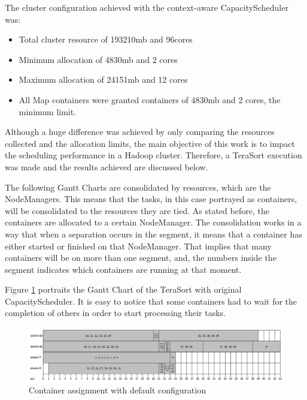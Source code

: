 The cluster configuration achieved with the context-aware CapacityScheduler was: 
\begin{itemize}
	\item Total cluster resource of 193210mb and 96cores
	\item Minimum allocation of 4830mb and 2 cores
	\item Maximum allocation of 24151mb and 12 cores
	\item All Map containers were granted containers of 4830mb and 2 cores, the minimum limit.
\end{itemize}

Although a huge difference was achieved by only comparing the resources collected and the allocation limits, the main objective of this work is to impact the scheduling performance in a Hadoop cluster. Therefore, a TeraSort execution was made and the results achieved are discussed below.

The following Gantt Charts are consolidated by resources, which are the NodeManagers. This means that the tasks, in this case portrayed as containers, will be consolidated to the resources they are tied. As stated before, the containers are allocated to a certain NodeManager. The consolidation works in a way that when a separation occurs in the segment, it means that a container has either started or finished on that NodeManager. That implies that many containers will be on more than one segment, and, the numbers inside the segment indicates which containers are running at that moment.

Figure \ref{fig:ganttDefault} portraits the Gantt Chart of the TeraSort with original CapacityScheduler. It is easy to notice that some containers had to wait for the completion of others in order to start processing their tasks.

\begin{figure}[hbtn]
   \renewcommand{\figurename}{Figure}
   \centering
   \includegraphics[width=16cm]{figuras/Figura16-GanttDefault.png}
   \caption{Container assignment with default configuration}
   \label{fig:ganttDefault}
\end{figure}

